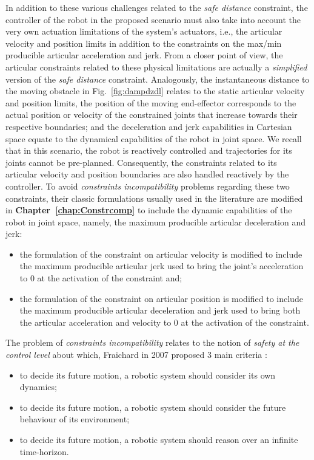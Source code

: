 In addition to these various challenges related to the \textit{safe distance} constraint, the controller of the robot in the proposed scenario must also take into account the very own actuation limitations of the system's actuators, i.e., the articular velocity and position limits in addition to the constraints on the max/min producible articular acceleration and jerk. From a closer point of view, the articular constraints related to these physical limitations are actually a \textit{simplified} version of the \textit{safe distance} constraint. Analogously, the instantaneous distance to the moving obstacle in Fig.~\ref{fig:dampdzdl} relates to the static articular velocity and position limits, the position of the moving end-effector corresponds to the actual position or velocity of the constrained joints that increase towards their respective boundaries; and the deceleration and jerk capabilities in Cartesian space equate to the dynamical capabilities of the robot in joint space. We recall that in this scenario, the robot is reactively controlled and trajectories for its joints cannot be pre-planned. Consequently, the constraints related to its articular velocity and position boundaries are also handled reactively by the controller. To avoid \textit{constraints incompatibility} problems regarding these two constraints,  their classic formulations usually used in the literature are modified in \textbf{Chapter~\ref{chap:Constrcomp}} to include the dynamic capabilities of the robot in joint space, namely, the maximum producible articular deceleration and jerk:
\begin{itemize}
\item the formulation of the constraint on articular velocity is modified to include the maximum producible articular jerk used to bring the joint's acceleration to $0$ at the activation of the constraint and;
\item the formulation of the constraint on articular position is modified to include the maximum producible articular deceleration and jerk used to bring both the articular acceleration and velocity to $0$ at the activation of the constraint.  
\end{itemize}
The problem of \textit{constraints incompatibility} relates to the notion of \textit{safety at the control level} about which, Fraichard in 2007 proposed 3 main criteria \cite{fraichard2007short}:
\begin{itemize}
\item to decide its future motion, a robotic system should consider its own dynamics; 
\item to decide its future motion, a robotic system should consider the future behaviour of its environment; 
\item to decide its future motion, a robotic system should reason over an infinite time-horizon.
\end{itemize}
